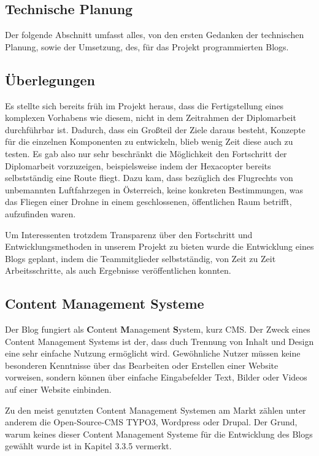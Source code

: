   \subsection{Technische Planung}
  Der folgende Abschnitt umfasst alles, von den ersten Gedanken der technischen Planung, sowie der Umsetzung,
  des, für das Projekt programmierten Blogs.

    \subsection*{Überlegungen}
    Es stellte sich bereits früh im Projekt heraus, dass die Fertigstellung eines komplexen Vorhabens wie diesem, nicht in
    dem Zeitrahmen der Diplomarbeit durchführbar ist. Dadurch, dass ein Großteil der Ziele daraus besteht, Konzepte für die
    einzelnen Komponenten zu entwickeln, blieb wenig Zeit diese auch zu testen. Es gab also nur sehr beschränkt die Möglichkeit
    den Fortschritt der Diplomarbeit vorzuzeigen, beispielsweise indem der Hexacopter bereits selbstständig eine Route fliegt.
    Dazu kam, dass bezüglich des Flugrechts von unbemannten Luftfahrzegen in Österreich, keine konkreten Bestimmungen, was das Fliegen einer Drohne in einem
    geschlossenen, öffentlichen Raum betrifft, aufzufinden waren.

    Um Interessenten trotzdem Transparenz über den Fortschritt und Entwicklungsmethoden in unserem Projekt zu bieten wurde
    die Entwicklung eines Blogs geplant, indem die Teammitglieder selbstständig, von Zeit zu Zeit Arbeitsschritte, als auch
    Ergebnisse veröffentlichen konnten.

    \subsection*{Content Management Systeme}
    Der Blog fungiert als \textbf{C}ontent \textbf{M}anagement \textbf{S}ystem, kurz CMS. Der Zweck eines
    Content Management Systems ist der, dass duch Trennung von Inhalt und Design eine
    sehr einfache Nutzung ermöglicht wird. Gewöhnliche Nutzer müssen keine besonderen
    Kenntnisse über das Bearbeiten oder Erstellen einer Website vorweisen, sondern
    können über einfache Eingabefelder Text, Bilder oder Videos auf einer Website einbinden.

    Zu den meist genutzten Content Management Systemen am Markt zählen unter anderem die Open-Source-CMS {TYPO3\cite{typo3}},
    {Wordpress\cite{wordpress}} oder {Drupal\cite{drupal}}. Der Grund, warum keines dieser Content Management Systeme für die
    Entwicklung des Blogs gewählt wurde ist in Kapitel 3.3.5 vermerkt.

